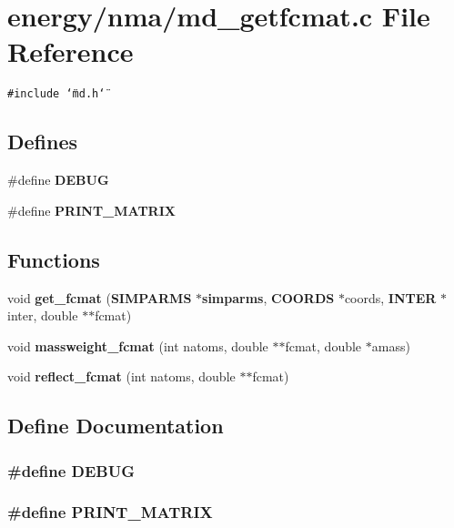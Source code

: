\section{energy/nma/md\_\-getfcmat.c File Reference}
\label{md__getfcmat_8c}
{\tt \#include \char`\"{}md.h\char`\"{}}\par
\subsection*{Defines}
\begin{CompactItemize}
\item 
\#define {\bf DEBUG}
\item 
\#define {\bf PRINT\_\-MATRIX}
\end{CompactItemize}
\subsection*{Functions}
\begin{CompactItemize}
\item 
void {\bf get\_\-fcmat} ({\bf SIMPARMS} $\ast${\bf simparms}, {\bf COORDS} $\ast$coords, {\bf INTER} $\ast$inter, double $\ast$$\ast$fcmat)
\item 
void {\bf massweight\_\-fcmat} (int natoms, double $\ast$$\ast$fcmat, double $\ast$amass)
\item 
void {\bf reflect\_\-fcmat} (int natoms, double $\ast$$\ast$fcmat)
\end{CompactItemize}


\subsection{Define Documentation}
\subsubsection{\setlength{\rightskip}{0pt plus 5cm}\#define DEBUG}\label{md__getfcmat_8c_d72dbcf6d0153db1b8d8a58001feed83}


\subsubsection{\setlength{\rightskip}{0pt plus 5cm}\#define PRINT\_\-MATRIX}\label{md__getfcmat_8c_3555b85480a61470b9b2121f841645e6}





